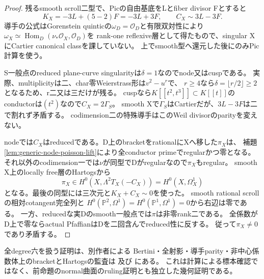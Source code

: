 \documentclass[a4paper,11pt]{ltjsarticle}
\theoremstyle{definition}
\begin{document}
\begin{proof}
残るsmooth scroll二型で、Picの自由基底をLとfiber divisor Fとすると
\[
 K_X=-3L+(5-2)F=-3L+3F,\qquad C_X\sim3L-3F.
\]
導手の公式はGorenstein quinticの$\omega_D=\mathcal O_D$と有限双対性により
$\omega_X\simeq\operatorname{Hom}_D(\nu_*\mathcal O_X,\mathcal O_D)$を
rank-one reflexive層として得たもので、singular XにCartier canonical classを課していない。
上でsmooth型へ還元した後にのみPic計算を使う。

S一般点のreduced plane-curve singularityは$\delta=1$なのでnode又はcuspである。
実際、multiplicityは二、char零Weierstrass形は$v^2-u^r$で、
$r\ge4$なら$\delta=\lfloor r/2\rfloor\ge2$となるため、r二又は三だけが残る。
cuspなら$K[[t^2,t^3]]\subset K[[t]]$のconductorは$(t^2)$なので$C_X=2\Gamma_S$。
smooth Xで$\Gamma_S$はCartierだが、$3L-3F$は二で割れず矛盾する。
codimension二の特殊導手はこのWeil divisorのparityを変えない。

nodeでは$C_X$はreducedである。D上のbracketをrationalにXへ移した$\pi_X$は、
補題\ref{lem:generic-node-poisson-lift}により全conductor primeでregularかつ零となる。
それ以外のcodimension一では$\nu$が同型でDがregularなので$\pi_X$もregular。
smooth X上のlocally free層のHartogsから
\[
 \pi_X\in H^0(X,\Lambda^2T_X(-C_X))
       =H^0(X,\Omega_X^1)
\]
となる。最後の同型には三次元と$K_X+C_X\sim0$を使った。
smooth rational scrollの相対cotangent完全列と
$H^0(\mathbb P^2,\Omega^1)=H^0(\mathbb P^1,\Omega^1)=0$から右辺は零である。
一方、reducedな実Dのsmooth一般点では$\pi$は非零rank二である。
全係数がD上で零ならactual PfaffianはDを二回含んでreduced性に反する。
従って$\pi_X\ne0$であり矛盾する。
\end{proof}
全degree六を扱う証明は、別作者による
Bertini・全射影・導手parity・非中心係数体上のbracketとHartogsの監査は
及び
にある。
これは計算による標本確認ではなく、前命題のnormal曲面のruling証明とも独立した幾何証明である。
\end{document}

